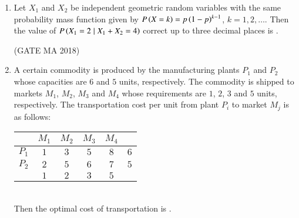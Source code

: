 \documentclass[journal,12pt,onecolumn]{IEEEtran}
\theoremstyle{remark}
\begin{document}
\begin{enumerate}[start=10]
\item Let $X_1$ and $X_2$ be independent geometric random variables with the same probability
mass function given by $P\left(X = k\right) = p\left(1 - p\right)^{k- 1}$, $k = 1, 2, \ldots$. Then the value of
$P\left(X_1 = 2 \mid X_1 + X_2 = 4\right)$ correct up to three decimal places is \underline{\hspace{2cm}}.

\hfill(GATE MA 2018)
\newpage
\item A certain commodity is produced by the manufacturing plants $P_1$ and $P_2$ whose capacities are
$6$ and $5$ units, respectively. The commodity is shipped to markets $M_1$, $M_2$, $M_3$ and $M_4$ whose
requirements are $1$, $2$, $3$ and $5$ units, respectively. The transportation cost per unit from plant
$P_i$ to market $M_j$ is as follows:\\[2pt]
\begin{minipage}{\linewidth}
\centering
\begin{tabular}{c|c|c|c|c|c}
& $M_1$ & $M_2$ & $M_3$ & $M_4$  \\ \hline
$P_1$ & $1$ & $3$ & $5$ & $8$ & $6$\\ \hline
$P_2$ & $2$ & $5$ & $6$ & $7$ & $5$\\ \hline
 & $1$ & $2$ & $3$ & $5$ 
\end{tabular}
\end{minipage}\\[4pt]
Then the optimal cost of transportation is \underline{\hspace{2cm}}. 

\hfill{}

\end{enumerate}
\end{document}
